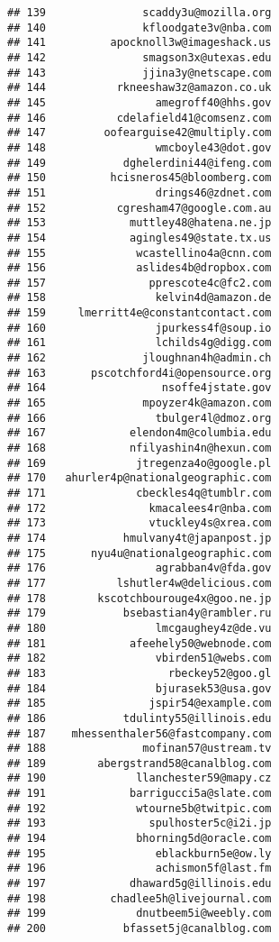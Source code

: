 \documentclass[]{article}
\begin{document}
\begin{verbatim}
## 139               scaddy3u@mozilla.org
## 140               kfloodgate3v@nba.com
## 141          apocknoll3w@imageshack.us
## 142               smagson3x@utexas.edu
## 143               jjina3y@netscape.com
## 144           rkneeshaw3z@amazon.co.uk
## 145                 amegroff40@hhs.gov
## 146           cdelafield41@comsenz.com
## 147         oofearguise42@multiply.com
## 148                 wmcboyle43@dot.gov
## 149            dghelerdini44@ifeng.com
## 150          hcisneros45@bloomberg.com
## 151                 drings46@zdnet.com
## 152           cgresham47@google.com.au
## 153             muttley48@hatena.ne.jp
## 154             agingles49@state.tx.us
## 155              wcastellino4a@cnn.com
## 156              aslides4b@dropbox.com
## 157                pprescote4c@fc2.com
## 158                 kelvin4d@amazon.de
## 159     lmerritt4e@constantcontact.com
## 160                 jpurkess4f@soup.io
## 161                 lchilds4g@digg.com
## 162               jloughnan4h@admin.ch
## 163       pscotchford4i@opensource.org
## 164                  nsoffe4jstate.gov
## 165               mpoyzer4k@amazon.com
## 166                 tbulger4l@dmoz.org
## 167             elendon4m@columbia.edu
## 168             nfilyashin4n@hexun.com
## 169              jtregenza4o@google.pl
## 170   ahurler4p@nationalgeographic.com
## 171              cbeckles4q@tumblr.com
## 172                kmacalees4r@nba.com
## 173                vtuckley4s@xrea.com
## 174            hmulvany4t@japanpost.jp
## 175       nyu4u@nationalgeographic.com
## 176                 agrabban4v@fda.gov
## 177           lshutler4w@delicious.com
## 178        kscotchbourouge4x@goo.ne.jp
## 179            bsebastian4y@rambler.ru
## 180                 lmcgaughey4z@de.vu
## 181             afeehely50@webnode.com
## 182                 vbirden51@webs.com
## 183                   rbeckey52@goo.gl
## 184                 bjurasek53@usa.gov
## 185                jspir54@example.com
## 186            tdulinty55@illinois.edu
## 187    mhessenthaler56@fastcompany.com
## 188               mofinan57@ustream.tv
## 189        abergstrand58@canalblog.com
## 190              llanchester59@mapy.cz
## 191             barrigucci5a@slate.com
## 192              wtourne5b@twitpic.com
## 193                spulhoster5c@i2i.jp
## 194              bhorning5d@oracle.com
## 195                 eblackburn5e@ow.ly
## 196                 achismon5f@last.fm
## 197             dhaward5g@illinois.edu
## 198          chadlee5h@livejournal.com
## 199              dnutbeem5i@weebly.com
## 200            bfasset5j@canalblog.com
\end{verbatim}
\end{document}
